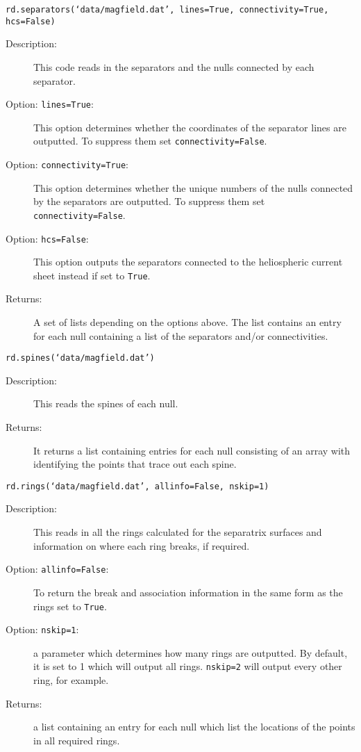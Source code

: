 \documentclass[12pt]{article}
\begin{document}
      \texttt{rd.separators(`data/magfield.dat', lines=True, connectivity=True, hcs=False)}

      \begin{description}
        \item [Description:] This code reads in the separators and the nulls connected by each separator.
        \item [Option: \texttt{lines=True}:] This option determines whether the coordinates of the separator lines are outputted. To suppress them set \texttt{connectivity=False}.
        \item [Option: \texttt{connectivity=True}:] This option determines whether the unique numbers of the nulls connected by the separators are outputted. To suppress them set \texttt{connectivity=False}.
        \item [Option: \texttt{hcs=False}:] This option outputs the separators connected to the heliospheric current sheet instead if set to \texttt{True}.
        \item [Returns:] A set of lists depending on the options above. The list contains an entry for each null containing a list of the separators and/or connectivities.
      \end{description}

      \texttt{rd.spines(`data/magfield.dat')}

      \begin{description}
        \item [Description:] This reads the spines of each null.
        \item [Returns:] It returns a list containing entries for each null consisting of an array with identifying the points that trace out each spine.
      \end{description}

      \texttt{rd.rings(`data/magfield.dat', allinfo=False, nskip=1)}

      \begin{description}
        \item [Description:] This reads in all the rings calculated for the separatrix surfaces and information on where each ring breaks, if required.
        \item [Option: \texttt{allinfo=False}:] To return the break and association information in the same form as the rings set to \texttt{True}.
        \item [Option: \texttt{nskip=1}:] a parameter which determines how many rings are outputted. By default, it is set to 1 which will output all rings. \texttt{nskip=2} will output every other ring, for example.
        \item [Returns:] a list containing an entry for each null which list the locations of the points in all required rings.
      \end{description}
\end{document}
